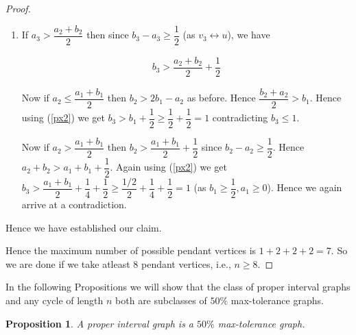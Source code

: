 \documentclass{article}
\newtheorem{prop}[thm]{Proposition}
\theoremstyle{definition}
\numberwithin{equation}{section}
\begin{document}
\begin{proof}
\begin{itemize}
\begin{enumerate}
\item If $a_{3}>\dfrac{a_{2}+b_{2}}{2}$ then since $b_{3}-a_{3}\geq \dfrac{1}{2}$ (as $v_{3}\leftrightarrow u$), we have

\begin{eqnarray}
\label{px2}
 b_{3}> \dfrac{a_{2}+ b_{2}}{2}+ \dfrac{1}{2}
\end{eqnarray}

Now if $a_{2}\leq \dfrac{a_{1}+b_{1}}{2}$ then $b_{2}> 2b_{1}-a_{2}$ as before. Hence $\dfrac{b_{2}+a_{2}}{2}>b_{1}.$  Hence using (\ref{px2}) we get $b_{3}>b_{1}+\dfrac{1}{2}\geq \dfrac{1}{2}+ \dfrac{1}{2}=1$ contradicting $b_{3}\leq 1.$ 

\vspace{0.2em}

Now if $a_{2}> \dfrac{a_{1}+b_{1}}{2}$ then $b_{2}>\dfrac{a_{1}+b_{1}}{2}+\dfrac{1}{2}$ since $b_{2}-a_{2}\geq \dfrac{1}{2}$. Hence $a_{2}+b_{2}>a_{1}+b_{1}+\dfrac{1}{2}.$ Again using (\ref{px2}) we get $b_{3}>\dfrac{a_{1}+b_{1}}{2}+\dfrac{1}{4}+\dfrac{1}{2}\geq \dfrac{1/2}{2}+ \dfrac{1}{4}+ \dfrac{1}{2}=1$ (as $b_{1}\geq \dfrac{1}{2},a_{1}\geq 0$). Hence we again arrive at a contradiction.
\end{enumerate}

\noindent Hence we have established our claim.
\end{itemize}

Hence the maximum number of possible pendant vertices is $1+2+2+2=7.$ So we are done if we take atleast 8 pendant vertices, i.e., $n\geq 8.$
\end{proof}


\noindent
In the following Propositions we will show that the class of proper interval graphs and any cycle of length $n$ both are subclasses of $50\%$ max-tolerance graphs.

\begin{prop}\label{proper2}
 A proper interval graph is a $50\%$ max-tolerance graph.
\end{prop}
\end{document}
